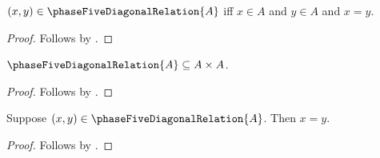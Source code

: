 \begin{proposition}\label{phase5_named_diagonal_relation_membership}
    $(x,y)\in\phaseFiveDiagonalRelation{A}$ iff
        $x\in A$ and $y\in A$ and $x=y$.
\end{proposition}
\begin{proof}
    Follows by
        .
\end{proof}

\begin{proposition}\label{phase5_named_diagonal_relation_subseteq}
    $\phaseFiveDiagonalRelation{A}\subseteq A\times A$.
\end{proposition}
\begin{proof}
    Follows by
        .
\end{proof}

\begin{proposition}\label{phase5_named_diagonal_relation_downstream}
    Suppose $(x,y)\in\phaseFiveDiagonalRelation{A}$.
    Then $x=y$.
\end{proposition}
\begin{proof}
    Follows by .
\end{proof}

